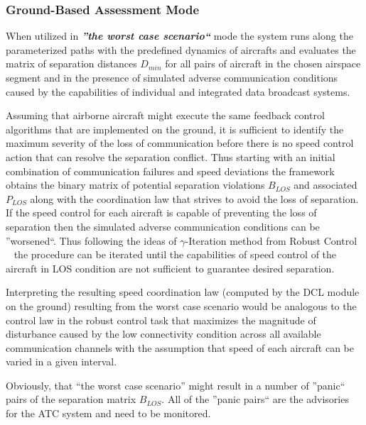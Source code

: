 \documentclass[letter,onecolumn,12pt]{aiaa-tc}
\newcommand{\1}{1_n}
\begin{document}
\subsubsection{Ground-Based Assessment Mode}

When utilized in \textbf{\emph{''the worst case scenario``}} mode the system runs along the  parameterized paths with the predefined dynamics of aircrafts and evaluates the matrix of separation distances $D_{min}$ for all pairs of aircraft in the chosen airspace segment  and in the presence of simulated adverse communication conditions caused by the capabilities of individual and integrated data broadcast systems.

Assuming that airborne aircraft might execute the same feedback control algorithms that are implemented on the ground, it is sufficient to identify the maximum severity of the loss of communication before there is no speed control action that can resolve the separation conflict. Thus starting with an initial combination of communication failures and speed deviations the framework obtains the binary matrix of potential separation violations $B_{LOS}$ and associated $P_{LOS}$ along with the coordination law that strives to avoid the loss of separation. If  the speed control for each aircraft is capable of preventing the loss of separation then the simulated adverse communication conditions can be ''worsened``. Thus following the ideas of $\gamma$-Iteration method from Robust Control ~\cite{zhou1998essentials} the procedure can be iterated until the capabilities of speed control of the aircraft in LOS condition are not sufficient to guarantee desired separation.

Interpreting the resulting speed coordination law (computed by the DCL module on the ground) resulting from the worst case scenario would be analogous to the control law in the robust control task that maximizes the magnitude of disturbance caused by the low connectivity condition across all available communication channels with the assumption that speed of each aircraft can be varied in a given interval.

Obviously, that ``the worst case scenario'' might result in a number of ''panic`` pairs of the separation matrix $B_{LOS}$. All of the ''panic pairs`` are the advisories for the ATC system and need to be monitored.
\end{document}
